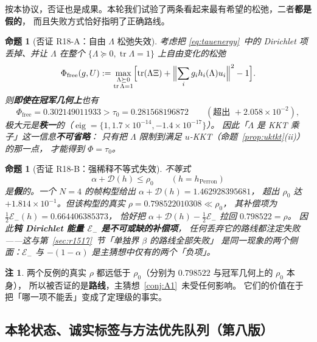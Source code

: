 \documentclass[UTF8,11pt]{ctexart}
\newtheorem{proposition}[theorem]{命题}
\theoremstyle{definition}
\newtheorem{remark}[theorem]{注}
\newcommand{\Lam}{\Lambda}
\newcommand{\tr}{\operatorname{tr}}
\begin{document}
按本协议，否证也是成果。本轮我们试验了两条看起来最有希望的松弛，二者\textbf{都是假的}，
而且失败方式恰好指明了正确路线。

\begin{proposition}[否证 R18-A：自由 $\Lam$ 松弛失效]\label{prop:refA}
考虑把 \eqref{eq:tauenergy}~中的 Dirichlet 项丢掉、并让 $\Lam$ 在整个
$\{\Lam\succeq0,\tr\Lam=1\}$ 上自由变化的松弛
\begin{equation}\label{eq:phifree}
\Phi_{\mathrm{free}}(g,U):=\max_{\substack{\Lam\succeq0\\\tr\Lam=1}}
\Bigl[\tr(\Lam\Xi)+\Bigl\|\sum_ig_ih_i(\Lam)u_i\Bigr\|^2-1\Bigr].
\end{equation}
则\textbf{即使在冠军几何上}也有
\[
\Phi_{\mathrm{free}}=0.302149011933>\tau_0=0.281568196872\qquad(\text{超出 }+2.058\times10^{-2}),
\]
极大元是\textbf{秩一}的（$\operatorname{eig}=\{1,1.7\times10^{-14},-1.4\times10^{-17}\}$）。
因此「$\Lam$ 是 KKT 乘子」这一信息\textbf{不可省略}：
只有把 $\Lam$ 限制到满足 $u$-KKT（命题~\ref{prop:uktkt}(ii)）的那一点，
才能得到 $\Phi=\tau_0$。
\end{proposition}

\begin{proposition}[否证 R18-B：强稀释不等式失效]\label{prop:refB}
不等式
\begin{equation}\label{eq:strongdil}
\alpha+\mathcal D(h)\le\rho_0\qquad(h=h_{\mathrm{Perron}})
\end{equation}
是\textbf{假}的。一个 $N=4$ 的帧构型给出 $\alpha+\mathcal D(h)=1.462928395681$，
超出 $\rho_0$ 达 $+1.814\times10^{-1}$。但该构型的真实 $\rho=0.798522010308\ll\rho_0$，
其补偿项为 $\tfrac12\mathcal E_-(h)=0.664406385373$，
恰好把 $\alpha+\mathcal D(h)-\tfrac12\mathcal E_-$ 拉回 $0.798522=\rho$。
因此\textbf{钝 Dirichlet 能量 $\mathcal E_-$ 是不可或缺的补偿项}，
任何丢弃它的路线都注定失败——这与第~\ref{sec:r1517}~节「单独界 $\beta$ 的路线全部失败」
是同一现象的两个侧面：$\mathcal E_-$ 与 $-(1-\alpha)$ 是主猜想中仅有的两个「负项」。
\end{proposition}

\begin{remark}\label{rmk:refsafe}
两个反例的真实 $\rho$ 都远低于 $\rho_0$（分别为 $0.798522$ 与冠军几何上的 $\rho_0$ 本身），
所以被否证的是\textbf{路线}，主猜想~\ref{conj:A1}~未受任何影响。
它们的价值在于把「哪一项不能丢」变成了定理级的事实。
\end{remark}

\subsection{本轮状态、诚实标签与方法优先队列（第八版）}\label{sec:r18:status}
\end{document}
